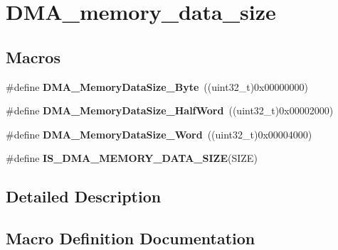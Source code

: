 \hypertarget{group___d_m_a__memory__data__size}{}\section{D\+M\+A\+\_\+memory\+\_\+data\+\_\+size}
\label{group___d_m_a__memory__data__size}
\subsection*{Macros}
\begin{DoxyCompactItemize}
\item 
\hypertarget{group___d_m_a__memory__data__size_gad6093bccb60ff9adf81e21c73c58ba17}{}\#define {\bfseries D\+M\+A\+\_\+\+Memory\+Data\+Size\+\_\+\+Byte}~((uint32\+\_\+t)0x00000000)\label{group___d_m_a__memory__data__size_gad6093bccb60ff9adf81e21c73c58ba17}

\item 
\hypertarget{group___d_m_a__memory__data__size_ga74c9b4e547f5eaaf35d4fd3d01ed5741}{}\#define {\bfseries D\+M\+A\+\_\+\+Memory\+Data\+Size\+\_\+\+Half\+Word}~((uint32\+\_\+t)0x00002000)\label{group___d_m_a__memory__data__size_ga74c9b4e547f5eaaf35d4fd3d01ed5741}

\item 
\hypertarget{group___d_m_a__memory__data__size_gaff403722a6f82d4b34c9ef306507bb98}{}\#define {\bfseries D\+M\+A\+\_\+\+Memory\+Data\+Size\+\_\+\+Word}~((uint32\+\_\+t)0x00004000)\label{group___d_m_a__memory__data__size_gaff403722a6f82d4b34c9ef306507bb98}

\item 
\#define {\bfseries I\+S\+\_\+\+D\+M\+A\+\_\+\+M\+E\+M\+O\+R\+Y\+\_\+\+D\+A\+T\+A\+\_\+\+S\+I\+Z\+E}(S\+I\+Z\+E)
\end{DoxyCompactItemize}


\subsection{Detailed Description}


\subsection{Macro Definition Documentation}
\hypertarget{group___d_m_a__memory__data__size_gac9e3748cebcb16d4ae4206d562bc804c}{}
